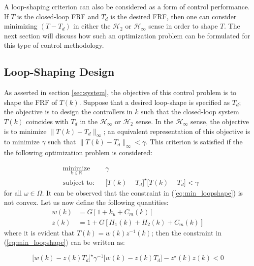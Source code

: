 \documentclass[a4paper, 10pt, conference]{ieeeconf}
\begin{document}
A loop-shaping criterion can also be considered as a form of control performance. If $T$ is the closed-loop FRF and $T_d$ is the desired FRF, then one can consider minimizing $(T-T_d)$ in either the $\mathcal{H}_2$ or $\mathcal{H}_\infty$ sense in order to shape $T$.  The next section will discuss how such an optimization problem can be formulated for this type of control methodology.

\subsection{Loop-Shaping Design}
\label{sec:loop_shape}
As asserted in section \ref{sec:system}, the objective of this control problem is to shape the FRF of $T(k)$. Suppose that a desired loop-shape is specified as $T_d$; the objective is to design the controllers in $k$ such that the closed-loop system $T(k)$ coincides with $T_d$ in the $\mathcal{H}_\infty$ or $\mathcal{H}_2$ sense. In the $\mathcal{H}_\infty$ sense, the objective is to minimize $ \|T(k) - T_d \|_\infty$; an equivalent representation of this objective is to minimize $\gamma$ such that $ \|T(k) - T_d \|_\infty < \gamma$. This criterion is satisfied if the the following optimization problem is considered:
 
 \begin{equation} \label{eq:min_loopshape}
\begin{aligned}
& \underset{ k \in \mathbb{R}}{\text{minimize}}
& & \gamma  \\
& \text{subject to:} & & \bigl[T(k)-T_d\bigr]^{\star}\bigl[T(k)-T_d\bigr] < \gamma
\end{aligned}
\end{equation}
for all $\omega \in \Omega$. It can be observed that the constraint in (\ref{eq:min_loopshape}) is not convex. Let us now define the following quantities:
\begin{equation} 
\begin{aligned}
w(k) &= G[1+k_u+C_m(k)] \\
z(k) &= 1+G[H_1(k)+H_2(k)+C_m(k)]
\end{aligned}
\end{equation}
where it is evident that $T(k) = w(k)z^{-1}(k)$; then the constraint in (\ref{eq:min_loopshape}) can be written as:

\begin{equation}
\bigl[w(k)-z(k)T_d \bigr]^{\star}\gamma^{-1} \bigl[w(k)-z(k)T_d \bigr] - z^{\star}(k)z(k)<0
\end{equation} 
\end{document}
